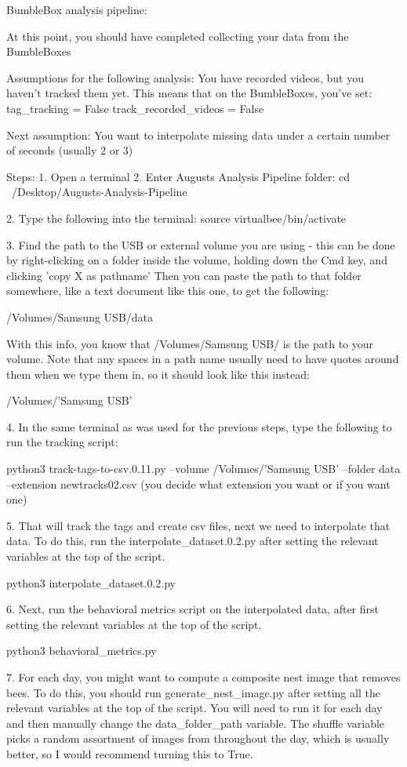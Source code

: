 BumbleBox analysis pipeline:

At this point, you should have completed collecting your data from the BumbleBoxes

Assumptions for the following analysis:
You have recorded videos, but you haven't tracked them yet. This means that on the BumbleBoxes, you've
set:
tag_tracking = False
track_recorded_videos = False

Next assumption: You want to interpolate missing data under a certain number of seconds (usually 2 or 3)





Steps:
1. Open a terminal
2. Enter Augusts Analysis Pipeline folder:
cd ~/Desktop/Augusts-Analysis-Pipeline

2. Type the following into the terminal: 
source virtualbee/bin/activate

3. Find the path to the USB or external volume you are using - this can be done by right-clicking on a folder inside the volume, 
holding down the Cmd key, and clicking 'copy X as pathname'
Then you can paste the path to that folder somewhere, like a text document like this one, to get the following:

/Volumes/Samsung USB/data

With this info, you know that /Volumes/Samsung USB/ is the path to your volume. Note that any spaces in a path name usually
need to have quotes around them when we type them in, so it should look like this instead:

/Volumes/'Samsung USB'

4. In the same terminal as was used for the previous steps, type the following to run the tracking script:

python3 track-tags-to-csv.0.11.py --volume /Volumes/'Samsung USB' --folder data --extension newtracks02.csv (you decide what extension you want or if you want one)

5. That will track the tags and create csv files, next we need to interpolate that data. To do this, run the interpolate_dataset.0.2.py after setting the relevant variables at the top of the script. 

python3 interpolate_dataset.0.2.py

6. Next, run the behavioral metrics script on the interpolated data, after first setting the relevant variables at the top of the script. 

python3 behavioral_metrics.py

7. For each day, you might want to compute a composite nest image that removes bees. To do this, you should run generate_nest_image.py after setting all the relevant variables at the top of the script. You will need to run it for each day and then manually change the data_folder_path variable. The shuffle variable picks a random assortment of images from throughout the day, which is usually better, so I would recommend turning this to True. 















